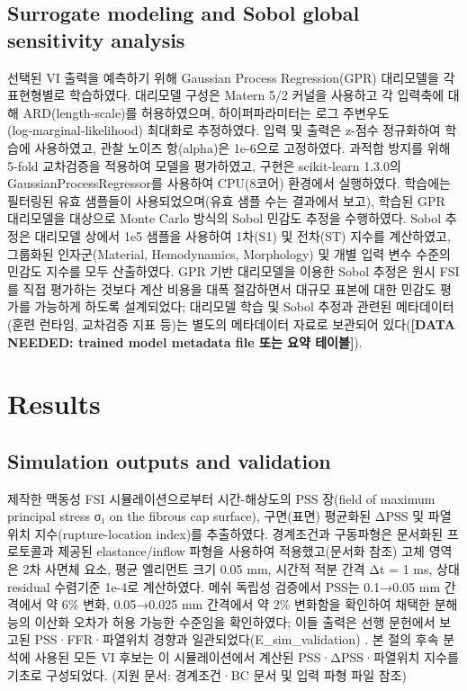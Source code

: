 \documentclass[preprint,12pt]{elsarticle}
\begin{document}
\subsection{Surrogate modeling and Sobol global sensitivity analysis}
선택된 VI 출력을 예측하기 위해 Gaussian Process Regression(GPR) 대리모델을 각 표현형별로 학습하였다. 대리모델 구성은 Matern 5/2 커널을 사용하고 각 입력축에 대해 ARD(length-scale)를 허용하였으며, 하이퍼파라미터는 로그 주변우도(log‑marginal‑likelihood) 최대화로 추정하였다. 입력 및 출력은 z-점수 정규화하여 학습에 사용하였고, 관찰 노이즈 항(alpha)은 1e-6으로 고정하였다. 과적합 방지를 위해 5-fold 교차검증을 적용하여 모델을 평가하였고, 구현은 scikit-learn 1.3.0의 GaussianProcessRegressor를 사용하여 CPU(8코어) 환경에서 실행하였다. 학습에는 필터링된 유효 샘플들이 사용되었으며(유효 샘플 수는 결과에서 보고), 학습된 GPR 대리모델을 대상으로 Monte Carlo 방식의 Sobol 민감도 추정을 수행하였다. Sobol 추정은 대리모델 상에서 1e5 샘플을 사용하여 1차(S1) 및 전차(ST) 지수를 계산하였고, 그룹화된 인자군(Material, Hemodynamics, Morphology) 및 개별 입력 변수 수준의 민감도 지수를 모두 산출하였다. GPR 기반 대리모델을 이용한 Sobol 추정은 원시 FSI를 직접 평가하는 것보다 계산 비용을 대폭 절감하면서 대규모 표본에 대한 민감도 평가를 가능하게 하도록 설계되었다; 대리모델 학습 및 Sobol 추정과 관련된 메타데이터(훈련 런타임, 교차검증 지표 등)는 별도의 메타데이터 자료로 보관되어 있다(\textbf{[DATA NEEDED: trained model metadata file 또는 요약 테이블]}).

\section{Results}

\subsection{Simulation outputs and validation}
제작한 맥동성 FSI 시뮬레이션으로부터 시간-해상도의 PSS 장(field of maximum principal stress σ₁ on the fibrous cap surface), 구면(표면) 평균화된 ΔPSS 및 파열위치 지수(rupture-location index)를 추출하였다. 경계조건과 구동파형은 문서화된 프로토콜과 제공된 elastance/inflow 파형을 사용하여 적용했고(문서화 참조) 고체 영역은 2차 사면체 요소, 평균 엘리먼트 크기 0.05 mm, 시간적 적분 간격 Δt = 1 ms, 상대 residual 수렴기준 1e-4로 계산하였다. 메쉬 독립성 검증에서 PSS는 0.1→0.05 mm 간격에서 약 6\% 변화, 0.05→0.025 mm 간격에서 약 2\% 변화함을 확인하여 채택한 분해능의 이산화 오차가 허용 가능한 수준임을 확인하였다; 이들 출력은 선행 문헌에서 보고된 PSS·FFR·파열위치 경향과 일관되었다(E\_sim\_validation) \cite{violetacarva2021}. 본 절의 후속 분석에 사용된 모든 VI 후보는 이 시뮬레이션에서 계산된 PSS·ΔPSS·파열위치 지수를 기초로 구성되었다. (지원 문서: 경계조건·BC 문서 및 입력 파형 파일 참조)
\end{document}
